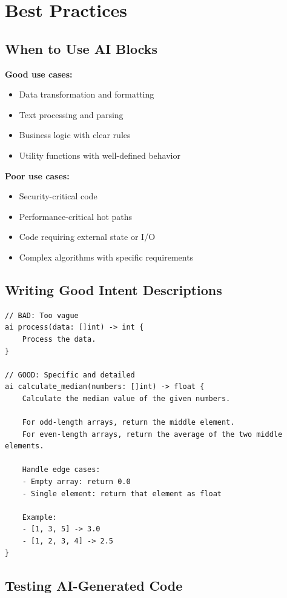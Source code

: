 \section{Best Practices}

\subsection{When to Use AI Blocks}

\textbf{Good use cases:}
\begin{itemize}
    \item Data transformation and formatting
    \item Text processing and parsing
    \item Business logic with clear rules
    \item Utility functions with well-defined behavior
\end{itemize}

\textbf{Poor use cases:}
\begin{itemize}
    \item Security-critical code
    \item Performance-critical hot paths
    \item Code requiring external state or I/O
    \item Complex algorithms with specific requirements
\end{itemize}

\subsection{Writing Good Intent Descriptions}

\begin{lstlisting}
// BAD: Too vague
ai process(data: []int) -> int {
    Process the data.
}

// GOOD: Specific and detailed
ai calculate_median(numbers: []int) -> float {
    Calculate the median value of the given numbers.

    For odd-length arrays, return the middle element.
    For even-length arrays, return the average of the two middle elements.

    Handle edge cases:
    - Empty array: return 0.0
    - Single element: return that element as float

    Example:
    - [1, 3, 5] -> 3.0
    - [1, 2, 3, 4] -> 2.5
}
\end{lstlisting}

\subsection{Testing AI-Generated Code}

